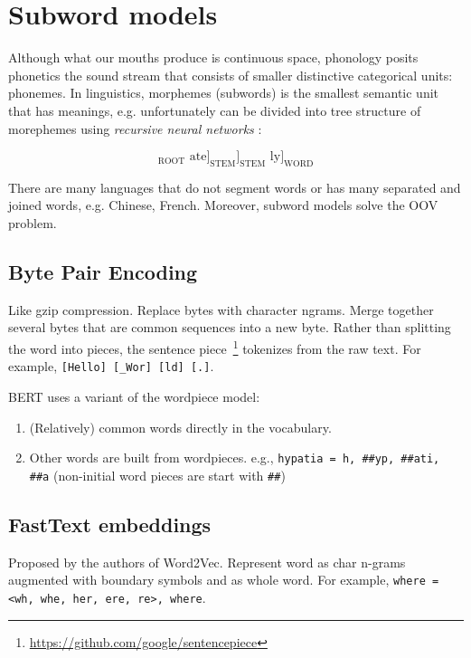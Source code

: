 \section{Subword models}

Although what our mouths produce is continuous space, phonology posits phonetics the sound stream that consists of smaller distinctive categorical units: phonemes.
In linguistics, morphemes (subwords) is the smallest semantic unit that has meanings, e.g. unfortunately can be divided into tree structure of morephemes using \emph{recursive neural networks} :

\begin{equation}
[[\text{un }[[\text{fortun(e)}]_{\text{ROOT}} \text{ ate}]_{\text{STEM}}]_{\text{STEM}}\text{ ly}]_{\text{WORD}} \nonumber
\end{equation}

There are many languages that do not segment words or has many separated and joined words, e.g. Chinese, French.
Moreover, subword models solve the OOV problem.

\subsection{Byte Pair Encoding}

Like gzip compression.
Replace bytes with character ngrams.
Merge together several bytes that are common sequences into a new byte.
Rather than splitting the word into pieces, the sentence piece~\footnote{\url{https://github.com/google/sentencepiece}} tokenizes from the raw text.
For example, \texttt{[Hello] [\_Wor] [ld] [.]}.

BERT uses a variant of the wordpiece model:

\begin{enumerate}
	\item (Relatively) common words directly in the vocabulary.
	\item Other words are built from wordpieces. e.g., \texttt{hypatia = h, \#\#yp, \#\#ati, \#\#a} (non-initial word pieces are start with \texttt{\#\#})
\end{enumerate}

\subsection{FastText embeddings}

Proposed by the authors of Word2Vec.
Represent word as char n-grams augmented with boundary symbols and as whole word.
For example, \texttt{where = <wh, whe, her, ere, re>, where}.

